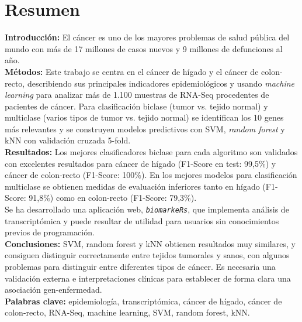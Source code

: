 \thispagestyle{plain}


\vspace{-30pt}

\section*{Resumen}

\textbf{Introducción:} El cáncer es uno de los mayores problemas de salud pública del mundo con más de 17 millones de casos nuevos y 9 millones de defunciones al año. \\

\textbf{Métodos:} Este trabajo se centra en el cáncer de hígado y el cáncer de colon-recto, describiendo sus principales indicadores epidemiológicos y usando \textit{machine learning} para analizar más de 1.100 muestras de RNA-Seq procedentes de pacientes de cáncer. Para clasificación biclase (tumor vs. tejido normal) y multiclase (varios tipos de tumor vs. tejido normal) se identifican los 10 genes más relevantes y se construyen modelos predictivos con SVM, \textit{random forest} y kNN con validación cruzada 5-fold.\\

\textbf{Resultados:} Los mejores clasificadores biclase para cada algoritmo son validados con excelentes resultados para cáncer de hígado (F1-Score en test: 99,5\%) y cáncer de colon-recto (F1-Score: 100\%). En los mejores modelos para clasificación multiclase se obtienen medidas de evaluación inferiores tanto en hígado (F1-Score: 91,8\%) como en colon-recto (F1-Score: 79,3\%).\\

Se ha desarrollado una aplicación web, \texttt{\textit{biomarkeRs}}, que implementa análisis de transcriptómica y puede resultar de utilidad para usuarios sin conocimientos previos de programación.\\

\textbf{Conclusiones:} SVM, random forest y kNN obtienen resultados muy similares, y consiguen distinguir correctamente entre tejidos tumorales y sanos, con algunos problemas para distinguir entre diferentes tipos de cáncer. Es necesaria una validación externa e interpretaciones clínicas para establecer de forma clara una asociación gen-enfermedad.\\

\textbf{Palabras clave:} epidemiología, transcriptómica, cáncer de hígado, cáncer de colon-recto, RNA-Seq, machine learning, SVM, random forest, kNN.

